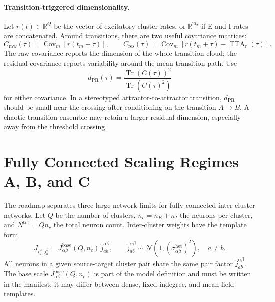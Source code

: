 \paragraph{Transition-triggered dimensionality.}
Let \(r(t)\in\mathbb R^Q\) be the vector of excitatory cluster rates, or
\(\mathbb R^{2Q}\) if E and I rates are concatenated. Around transitions,
there are two useful covariance matrices:
\begin{equation}
    C_{\mathrm{raw}}(\tau)
    =
    \operatorname{Cov}_m[r(t_m+\tau)],
    \qquad
    C_{\mathrm{res}}(\tau)
    =
    \operatorname{Cov}_m[
    r(t_m+\tau)-\operatorname{TTA}_r(\tau)].
    \label{eq:ch09-transition-covariances}
\end{equation}
The raw covariance reports the dimension of the whole transition cloud; the
residual covariance reports variability around the mean transition path. Use
\[
    d_{\mathrm{PR}}(\tau)
    =
    \frac{\operatorname{Tr}(C(\tau))^2}{\operatorname{Tr}(C(\tau)^2)}
\]
for either covariance. In a stereotyped attractor-to-attractor transition,
\(d_{\mathrm{PR}}\) should be small near the crossing after conditioning on
the transition \(A\to B\). A chaotic transition ensemble may retain a larger
residual dimension, especially away from the threshold crossing.

\section{Fully Connected Scaling Regimes A, B, and C}
\label{sec:ch09-abc-regimes}

The roadmap separates three large-network limits for fully connected
inter-cluster networks. Let \(Q\) be the number of clusters, \(n_c=n_E+n_I\)
the neurons per cluster, and \(N^{\mathrm{tot}}=Qn_c\) the total neuron count.
Inter-cluster weights have the template form
\begin{equation}
    J_{i_a^\alpha,j_b^\beta}
    =
    J_{\alpha\beta}^{\mathrm{base}}(Q,n_c)\,
    \check j_{ab}^{\alpha\beta},
    \qquad
    \check j_{ab}^{\alpha\beta}\sim
    \mathcal{N}\!\left(1,(\sigma_{\alpha\beta}^{\mathrm{het}})^2\right),
    \quad a\ne b.
    \label{eq:ch09-fully-connected-random-weights}
\end{equation}
All neurons in a given source-target cluster pair share the same pair factor
\(\check j_{ab}^{\alpha\beta}\). The base scale
\(J_{\alpha\beta}^{\mathrm{base}}(Q,n_c)\) is part of the model definition and
must be written in the manifest; it may differ between dense, fixed-indegree,
and mean-field templates.

